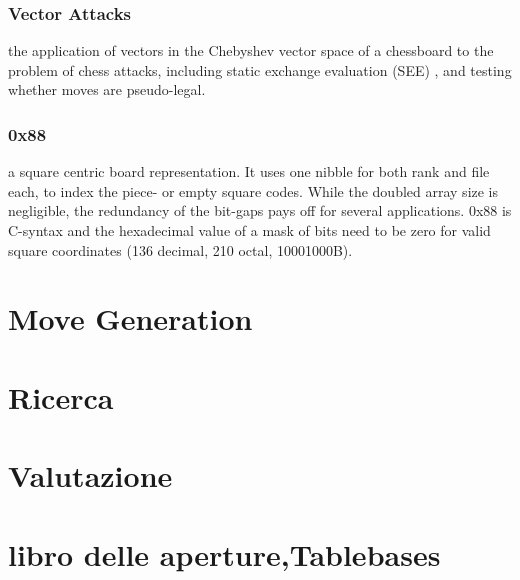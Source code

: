 \subsubsection{Vector Attacks}
the application of vectors in the Chebyshev vector space of a chessboard to the problem of chess attacks, including static exchange evaluation (SEE)
, and testing whether moves are pseudo-legal.

\subsubsection{0x88}
a square centric board representation. It uses one nibble for both rank and file each, to index the piece- or empty square codes. While the doubled
array size is negligible, the redundancy of the bit-gaps pays off for several applications. 0x88 is C-syntax and the hexadecimal value of a mask of
bits need to be zero for valid square coordinates (136 decimal, 210 octal, 10001000B).





\section{Move Generation} %


\section{Ricerca} %

\section{Valutazione} %

\section{libro delle aperture,Tablebases} %

